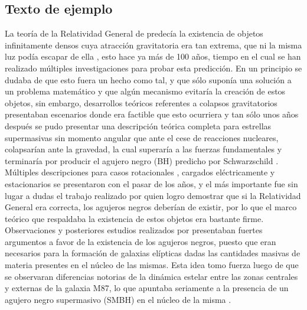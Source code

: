 \documentclass[11pt,letterpaper]{article}
\begin{document}
\begin{multicols}{2}
\subsection*{Texto de ejemplo}
La teoría de la Relatividad General de \cite{Einstein1915} predecía la existencia de objetos infinitamente densos cuya atracción gravitatoria era tan extrema, que ni la misma luz podía escapar de ella \citep{Schwarzschild_2003}, esto hace ya más de 100 años, tiempo en el cual se han realizado múltiples investigaciones para probar esta predicción. En un principio se dudaba de que esto fuera un hecho como tal, y que sólo suponía una solución a un problema matemático y que algún mecanismo evitaría la creación de estos objetos, sin embargo, desarrollos teóricos referentes a colapsos gravitatorios presentaban escenarios donde era factible que esto ocurriera \citep{10.1093/mnras/91.5.456} y tan sólo unos años después se pudo presentar una descripción teórica completa para estrellas supermasivas sin momento angular que ante el cese de reacciones nucleares, colapsarían ante la gravedad, la cual superaría a las fuerzas fundamentales y terminaría por producir el agujero negro (BH) predicho por Schwarzschild \citep{PhysRev.56.455}. Múltiples descripciones para casos rotacionales \citep{PhysRevLett.11.237}, cargados eléctricamente \citep{newman1965metric} y estacionarios \citep{israel1967event} se presentaron con el pasar de los años, y el más importante fue sin lugar a dudas el trabajo realizado por \cite{PhysRevLett.14.57} quien logro demostrar que si la Relatividad General era correcta, los agujeros negros deberían de existir, por lo que el marco teórico que respaldaba la existencia de estos objetos era bastante firme.\\
Observaciones y posteriores estudios realizados por \cite{1970ApJ...161..419W} presentaban fuertes argumentos a favor de la existencia de los agujeros negros, puesto que eran necesarios para la formación de galaxias elípticas dadas las cantidades masivas de materia presentes en el núcleo de las mismas. Esta idea tomo fuerza luego de que se observaran diferencias notorias de la dinámica estelar entre las zonas centrales y externas de la galaxia M87, lo que apuntaba seriamente a la presencia de un agujero negro supermasivo (SMBH) en el núcleo de la misma \citep{sargent1978dynamical}.\\

\end{multicols}
\end{document}
